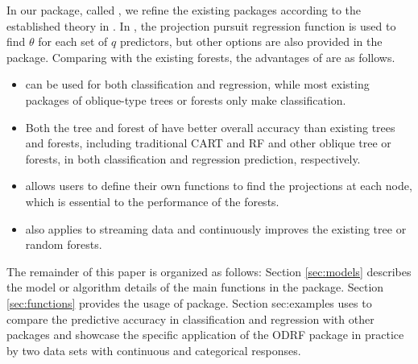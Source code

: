 \documentclass[nojss]{jss}
\numberwithin{equation}{section}
\begin{document}
In our package, called ,  we refine the existing    \citep{R} packages according to the established theory in  \cite{zhan2022consistency}.
In , the projection pursuit regression function is used to find $ \theta $ for each set of $ q $ predictors, but other options are also provided in the package. %
Comparing with the existing forests, the advantages of  are as follows.
\begin{itemize}

\item {} can be used for both classification and regression, while most existing packages of oblique-type trees or forests only make classification.
\item Both the tree and forest of  have better overall accuracy than existing trees and forests, including traditional CART and RF and other oblique tree or forests, in both classification and regression prediction, respectively.



\item {} allows users to define their own functions to find the projections  at each node, which is essential to the performance of the forests.

\item {} also applies to streaming data and continuously improves the existing tree or random forests.

\end{itemize}

The remainder of this paper is organized as follows: Section \ref{sec:models} describes the model or algorithm details of the main functions in the  package. Section \ref{sec:functions} provides the usage of  package. Section {sec:examples} uses    to compare the predictive accuracy  in classification and regression with other  packages and showcase the specific application of the ODRF package in practice by two data sets with continuous and categorical responses. %


\end{document}
